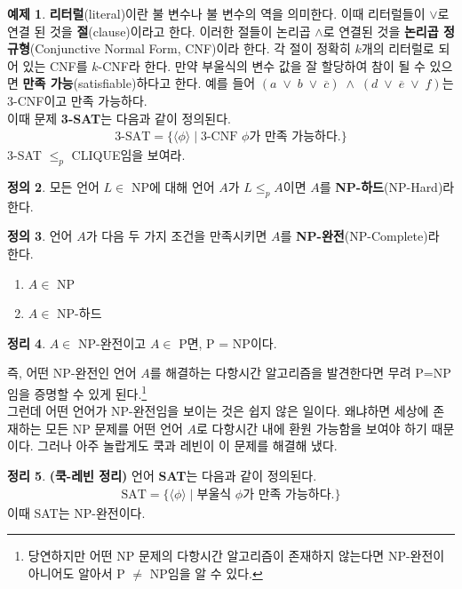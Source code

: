 \documentclass[b5paper, 11pt]{book}
\theoremstyle{definition}
\newtheorem{defn}{정의}[chapter]
\newtheorem{thm}[defn]{정리}
\newtheorem{ex}[defn]{예제}
\begin{document}
\begin{ex}
    \textbf{리터럴}(literal)이란 불 변수나 불 변수의 역을 의미한다. 이때 리터럴들이 $\vee$로 연결 된 것을 \textbf{절}(clause)이라고 한다. 이러한 절들이 논리곱 $\wedge$로 연결된 것을 \textbf{논리곱 정규형}(Conjunctive Normal Form, CNF)이라 한다. 각 절이 정확히 $k$개의 리터럴로 되어 있는 CNF를 $k$-CNF라 한다. 만약 부울식의 변수 값을 잘 할당하여 참이 될 수 있으면 \textbf{만족 가능}(satisfiable)하다고 한다. 예를 들어 $(a \; \vee\; b \;\vee\; \overline{c} ) \;\wedge\; (d \;\vee\; \overline{e}\; \vee\; f)$는 3-CNF이고 만족 가능하다. \\ 
    이때 문제 \textbf{3-SAT}는 다음과 같이 정의된다. 
    \begin{align*}
        \text{3-SAT} = \{\langle \phi \rangle \;\vert\; \text{3-CNF }\phi\text{가 만족 가능하다.} \}
    \end{align*}   
    3-SAT $\le_p$ CLIQUE임을 보여라.
\end{ex}
\begin{defn}
    모든 언어 $L \in$ NP에 대해 언어 $A$가 $L \le_p A$이면 $A$를 \textbf{NP-하드}(NP-Hard)라 한다. 
\end{defn}
\begin{defn}
    언어 $A$가 다음 두 가지 조건을 만족시키면 $A$를 \textbf{NP-완전}(NP-Complete)라 한다.
    \begin{enumerate}
        \item $A \in$ NP
        \item $A \in$ NP-하드
    \end{enumerate}
\end{defn}
\begin{thm}
    $A \in$ NP-완전이고 $A \in$ P면, P = NP이다.
\end{thm}
즉, 어떤 NP-완전인 언어 $A$를 해결하는 다항시간 알고리즘을 발견한다면 무려 P=NP임을 증명할 수 있게 된다.\footnote{당연하지만 어떤 NP 문제의 다항시간 알고리즘이 존재하지 않는다면 NP-완전이 아니어도 알아서 P $\neq$ NP임을 알 수 있다.} \\ 
그런데 어떤 언어가 NP-완전임을 보이는 것은 쉽지 않은 일이다. 왜냐하면 세상에 존재하는 모든 NP 문제를 어떤 언어 $A$로 다항시간 내에 환원 가능함을 보여야 하기 때문이다. 그러나 아주 놀랍게도 쿡과 레빈이 이 문제를 해결해 냈다.
\begin{thm}
    \label{SAT np-complete}
    \textbf{(쿡-레빈 정리)} 언어 \textbf{SAT}는 다음과 같이 정의된다.
    \begin{align*}
        \text{SAT} = \{\langle \phi \rangle \;\vert\; \text{부울식 } \phi \text{가 만족 가능하다.}\}
    \end{align*} 
    이때 SAT는 NP-완전이다.
\end{thm}
\end{document}
